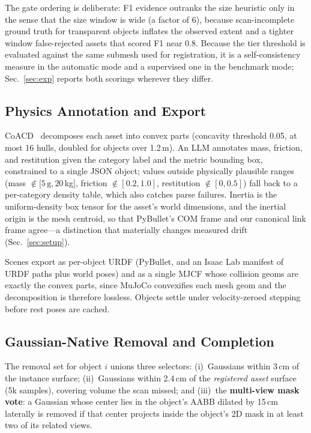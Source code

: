 The gate ordering is deliberate: F1 evidence outranks the size heuristic
only in the sense that the size window is wide (a factor of 6), because
scan-incomplete ground truth for transparent objects inflates the observed
extent and a tighter window false-rejected assets that scored F1 near 0.8.
Because the tier threshold is evaluated against the same submesh used for
registration, it is a self-consistency measure in the automatic mode and a
supervised one in the benchmark mode; Sec.~\ref{sec:exp} reports both
scorings wherever they differ.

\subsection{Physics Annotation and Export}
CoACD~\cite{coacd} decomposes each asset into convex parts (concavity
threshold 0.05, at most 16 hulls, doubled for objects over 1.2\,m). An
LLM annotates mass, friction, and restitution given the category label
and the metric bounding box, constrained to a single JSON object; values
outside physically plausible ranges (mass $\notin[5\,\text{g},20\,$kg$]$,
friction $\notin[0.2,1.0]$, restitution $\notin[0,0.5]$) fall back to a
per-category density table, which also catches parse failures. Inertia is
the uniform-density box tensor for the asset's world dimensions, and the
inertial origin is the mesh centroid, so that PyBullet's COM frame and
our canonical link frame agree---a distinction that materially changes
measured drift (Sec.~\ref{sec:setup}).

Scenes export as per-object URDF (PyBullet, and an Isaac Lab manifest of
URDF paths plus world poses) and as a single MJCF whose collision geoms
are exactly the convex parts, since MuJoCo convexifies each mesh geom and
the decomposition is therefore lossless. Objects settle under
velocity-zeroed stepping~\cite{simfoundry} before rest poses are cached.

\subsection{Gaussian-Native Removal and Completion}
\label{sec:removal}
The removal set for object $i$ unions three selectors:
(i)~Gaussians within 3\,cm of the instance surface;
(ii)~Gaussians within 2.4\,cm of the \emph{registered asset} surface
(5k samples), covering volume the scan missed; and
(iii)~the \textbf{multi-view mask vote}: a Gaussian whose center lies in
the object's AABB dilated by 15\,cm laterally is removed if that center
projects inside the object's 2D mask in at least two of its related
views.

